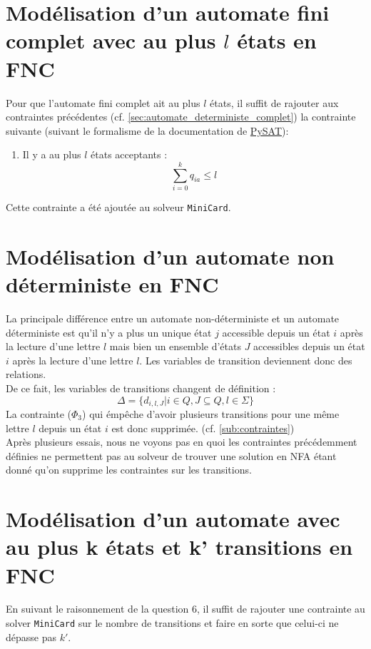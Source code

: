 \documentclass[a4paper, 12pt]{extarticle}
\begin{document}
\section{Modélisation d'un automate fini complet avec au plus $l$ états en FNC}
\noindent Pour que l'automate fini complet ait au plus $l$ états, il suffit de rajouter aux contraintes précédentes (cf. \ref{sec:automate_deterministe_complet}) 
la contrainte suivante (suivant le formalisme de la documentation de \href{https://pysathq.github.io/docs/html/api/solvers.html#pysat.solvers.Solver.add_atmost}{PySAT}):
\begin{enumerate}
    \item Il y a au plus $l$ états acceptants :
    \begin{equation*}
        \sum_{i=0}^{k} q_{ia} \le l
    \end{equation*}
\end{enumerate}
Cette contrainte a été ajoutée au solveur \texttt{MiniCard}.


\section{Modélisation d'un automate non déterministe en FNC}
\label{sec:non_deterministe}
\noindent La principale différence entre un automate non-déterministe et un automate déterministe est qu'il n'y a plus un unique état $j$ accessible depuis un état $i$
après la lecture d'une lettre $l$ mais bien un ensemble d'états $J$ accessibles depuis un état $i$ après la lecture d'une lettre $l$. Les variables de transition deviennent
donc des relations. \\
De ce fait, les variables de transitions changent de définition :
\begin{equation*}
    \Delta = \{d_{i, l, J} | i\in Q, J\subseteq Q, l \in \Sigma\}
\end{equation*}
La contrainte ($\Phi_3$) qui émpêche d'avoir plusieurs transitions pour une même lettre $l$ depuis un état $i$ est donc supprimée. (cf. \ref{sub:contraintes})\\
Après plusieurs essais, nous ne voyons pas en quoi les contraintes précédemment définies ne permettent pas au solveur de trouver une solution en NFA étant donné
qu'on supprime les contraintes sur les transitions. 


\section{Modélisation d'un automate avec au plus k états et k' transitions en FNC}
En suivant le raisonnement de la question 6, il suffit de rajouter une contrainte au solver \texttt{MiniCard} 
sur le nombre de transitions et faire en sorte que celui-ci ne dépasse pas $k'$.


\end{document}
